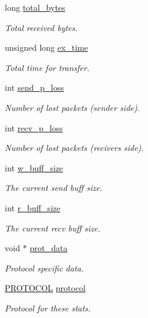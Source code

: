 \begin{DoxyCompactItemize}
long \hyperlink{structtb__prot__stats__t_af793b9ec786f2ae3a01e61bd38994e72}{total\-\_\-bytes}
\begin{DoxyCompactList}\small\item\em Total received bytes. \end{DoxyCompactList}\item 
unsigned long \hyperlink{structtb__prot__stats__t_aac25bc0f34fbf812aa9ad386f7a7574f}{ex\-\_\-time}
\begin{DoxyCompactList}\small\item\em Total time for transfer. \end{DoxyCompactList}\item 
int \hyperlink{structtb__prot__stats__t_a0bd7c47cdd9a90293b61401e8e408569}{send\-\_\-p\-\_\-loss}
\begin{DoxyCompactList}\small\item\em Number of lost packets (sender side). \end{DoxyCompactList}\item 
int \hyperlink{structtb__prot__stats__t_ad24965ef016625acedfa758f91151fb6}{recv\-\_\-p\-\_\-loss}
\begin{DoxyCompactList}\small\item\em Number of lost packets (recivers side). \end{DoxyCompactList}\item 
int \hyperlink{structtb__prot__stats__t_a90beb7bd16530af85b6858932d219ed5}{w\-\_\-buff\-\_\-size}
\begin{DoxyCompactList}\small\item\em The current send buff size. \end{DoxyCompactList}\item 
int \hyperlink{structtb__prot__stats__t_a0875385576dea06176e123aca81e2b53}{r\-\_\-buff\-\_\-size}
\begin{DoxyCompactList}\small\item\em The current recv buff size. \end{DoxyCompactList}\item 
void $\ast$ \hyperlink{structtb__prot__stats__t_ab79822e20d19ce95bdf8a3f95bd616d5}{prot\-\_\-data}
\begin{DoxyCompactList}\small\item\em Protocol specific data. \end{DoxyCompactList}\item 
\hyperlink{tb__protocol_8h_a7a5bff1040fc154c510874327d44cc1a}{P\-R\-O\-T\-O\-C\-O\-L} \hyperlink{structtb__prot__stats__t_a0d2276cd987e688180eedab183cd503e}{protocol}
\begin{DoxyCompactList}\small\item\em Protocol for these stats. \end{DoxyCompactList}\end{DoxyCompactItemize}


